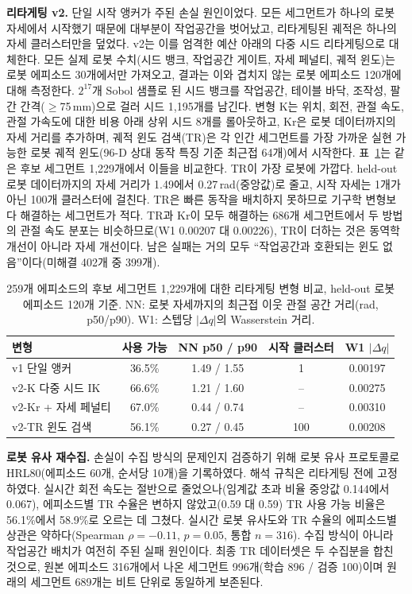 \documentclass[conference,10pt]{IEEEtran}
\newcommand{\mm}{\,mm\xspace}
\begin{document}
\textbf{리타게팅 v2.} 단일 시작 앵커가 주된 손실 원인이었다. 모든 세그먼트가 하나의 로봇 자세에서 시작했기 때문에 대부분이 작업공간을
벗어났고, 리타게팅된 궤적은 하나의 자세 클러스터만을 덮었다. v2는 이를 엄격한 예산 아래의 다중 시드 리타게팅으로 대체한다. 모든 실제
로봇 수치(시드 뱅크, 작업공간 게이트, 자세 페널티, 궤적 윈도)는 로봇 에피소드 30개에서만 가져오고, 결과는 이와 겹치지 않는 로봇
에피소드 120개에 대해 측정한다. $2^{17}$개 Sobol 샘플로 된 시드 뱅크를 작업공간, 테이블 바닥, 조작성, 팔 간 간격($\ge$75\mm)으로
걸러 시드 1{,}195개를 남긴다. 변형 K는 위치, 회전, 관절 속도, 관절 가속도에 대한 비용 아래 상위 시드 8개를 롤아웃하고, Kr은 로봇
데이터까지의 자세 거리를 추가하며, 궤적 윈도 검색(TR)은 각 인간 세그먼트를 가장 가까운 실현 가능한 로봇 궤적 윈도(96-D 상대 동작
특징 기준 최근접 64개)에서 시작한다. 표~\ref{tab:retarget}는 같은 후보 세그먼트 1{,}229개에서 이들을 비교한다. TR이 가장 로봇에
가깝다. held-out 로봇 데이터까지의 자세 거리가 1.49에서 0.27\,rad(중앙값)로 줄고, 시작 자세는 1개가 아닌 100개 클러스터에 걸친다.
TR은 빠른 동작을 배치하지 못하므로 기구학 변형보다 해결하는 세그먼트가 적다. TR과 Kr이 모두 해결하는 686개 세그먼트에서 두 방법의
관절 속도 분포는 비슷하므로(W1 0.00207 대 0.00226), TR이 더하는 것은 동역학 개선이 아니라 자세 개선이다. 남은 실패는 거의 모두
``작업공간과 호환되는 윈도 없음''이다(미해결 402개 중 399개).

\begin{table}[t]
\centering\footnotesize\setlength{\tabcolsep}{3.5pt}
\caption{259개 에피소드의 후보 세그먼트 1{,}229개에 대한 리타게팅 변형 비교, held-out 로봇 에피소드 120개 기준.
NN: 로봇 자세까지의 최근접 이웃 관절 공간 거리(rad, p50/p90). W1: 스텝당 $|\Delta q|$의 Wasserstein 거리.}
\label{tab:retarget}
\begin{tabular}{@{}lcccc@{}}
\toprule
변형 & 사용 가능 & NN p50 / p90 & 시작 클러스터 & W1 $|\Delta q|$ \\
\midrule
v1 단일 앵커 & 36.5\% & 1.49 / 1.55 & 1 & 0.00197 \\
v2-K 다중 시드 IK & 66.6\% & 1.21 / 1.60 & -- & 0.00275 \\
v2-Kr + 자세 페널티 & 67.0\% & 0.44 / 0.74 & -- & 0.00310 \\
v2-TR 윈도 검색 & 56.1\% & 0.27 / 0.45 & 100 & 0.00208 \\
\bottomrule
\end{tabular}
\end{table}

\textbf{로봇 유사 재수집.} 손실이 수집 방식의 문제인지 검증하기 위해 로봇 유사 프로토콜로 HRL80(에피소드 60개, 순서당 10개)을
기록하였다. 해석 규칙은 리타게팅 전에 고정하였다. 실시간 회전 속도는 절반으로 줄었으나(임계값 초과 비율 중앙값 0.144에서 0.067),
에피소드별 TR 수율은 변하지 않았고(0.59 대 0.59) TR 사용 가능 비율은 56.1\%에서 58.9\%로 오르는 데 그쳤다. 실시간 로봇 유사도와 TR
수율의 에피소드별 상관은 약하다(Spearman $\rho=-0.11$, $p=0.05$, 통합 $n=316$). 수집 방식이 아니라 작업공간 배치가 여전히 주된 실패
원인이다. 최종 TR 데이터셋은 두 수집분을 합친 것으로, 원본 에피소드 316개에서 나온 세그먼트 996개(학습 896 / 검증 100)이며 원래의
세그먼트 689개는 비트 단위로 동일하게 보존된다.
\end{document}
